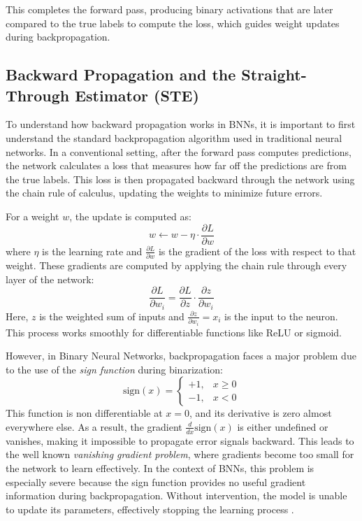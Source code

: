 \documentclass[a4paper,12pt]{report}
\begin{document}
This completes the forward pass, producing binary activations that are later compared to the true labels to compute the loss, which guides weight updates during backpropagation.


\clearpage
\subsection{Backward Propagation and the Straight-Through Estimator (STE)}
To understand how backward propagation works in BNNs, it is important to first understand the standard backpropagation algorithm used in traditional neural networks. In a conventional setting, after the forward pass computes predictions, the network calculates a loss that measures how far off the predictions are from the true labels. This loss is then propagated backward through the network using the chain rule of calculus, updating the weights to minimize future errors.

For a weight \(w\), the update is computed as:
\[w \leftarrow w - \eta \cdot \frac{\partial L}{\partial w}\]
where \( \eta \) is the learning rate and \( \frac{\partial L}{\partial w} \) is the gradient of the loss with respect to that weight. These gradients are computed by applying the chain rule through every layer of the network:
\[\frac{\partial L}{\partial w_i} = \frac{\partial L}{\partial z} \cdot \frac{\partial z}{\partial w_i}\]
Here, \(z\) is the weighted sum of inputs and \( \frac{\partial z}{\partial w_i} = x_i \) is the input to the neuron. This process works smoothly for differentiable functions like ReLU or sigmoid.

However, in Binary Neural Networks, backpropagation faces a major problem due to the use of the \textit{sign function} during binarization:
\[\text{sign}(x) = 
\begin{cases}
+1, & x \geq 0 \\
-1, & x < 0
\end{cases}\]
This function is non differentiable at \(x = 0\), and its derivative is zero almost everywhere else. As a result, the gradient \( \frac{d}{dx} \text{sign}(x) \) is either undefined or vanishes, making it impossible to propagate error signals backward. This leads to the well known \textit{vanishing gradient problem}, where gradients become too small for the network to learn effectively. In the context of BNNs, this problem is especially severe because the sign function provides no useful gradient information during backpropagation. Without intervention, the model is unable to update its parameters, effectively stopping the learning process \cite{bengio2013estimatingpropagatinggradientsstochastic}.
\end{document}
